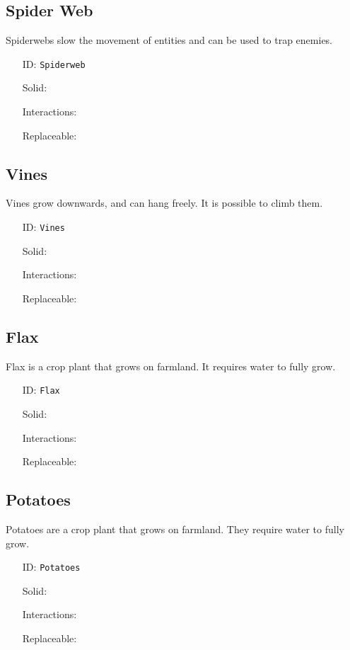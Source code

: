 \subsection{Spider Web}\label{subsec:blocks_spider web}
Spiderwebs slow the movement of entities and can be used to trap enemies.
\newline
\begin{itemize}[nosep]
\item[ID:] \texttt{Spiderweb}
\item[Solid:]  \XSolidBrush \item[Interactions:]  \XSolidBrush \item[Replaceable:]  \XSolidBrush \end{itemize}

\subsection{Vines}\label{subsec:blocks_vines}
Vines grow downwards, and can hang freely. It is possible to climb them.
\newline
\begin{itemize}[nosep]
\item[ID:] \texttt{Vines}
\item[Solid:]  \XSolidBrush \item[Interactions:]  \XSolidBrush \item[Replaceable:]  \XSolidBrush \end{itemize}

\subsection{Flax}\label{subsec:blocks_flax}
Flax is a crop plant that grows on farmland. It requires water to fully grow.
\newline
\begin{itemize}[nosep]
\item[ID:] \texttt{Flax}
\item[Solid:]  \XSolidBrush \item[Interactions:]  \XSolidBrush \item[Replaceable:]  \XSolidBrush \end{itemize}

\subsection{Potatoes}\label{subsec:blocks_potatoes}
Potatoes are a crop plant that grows on farmland. They require water to fully grow.
\newline
\begin{itemize}[nosep]
\item[ID:] \texttt{Potatoes}
\item[Solid:]  \XSolidBrush \item[Interactions:]  \XSolidBrush \item[Replaceable:]  \XSolidBrush \end{itemize}


